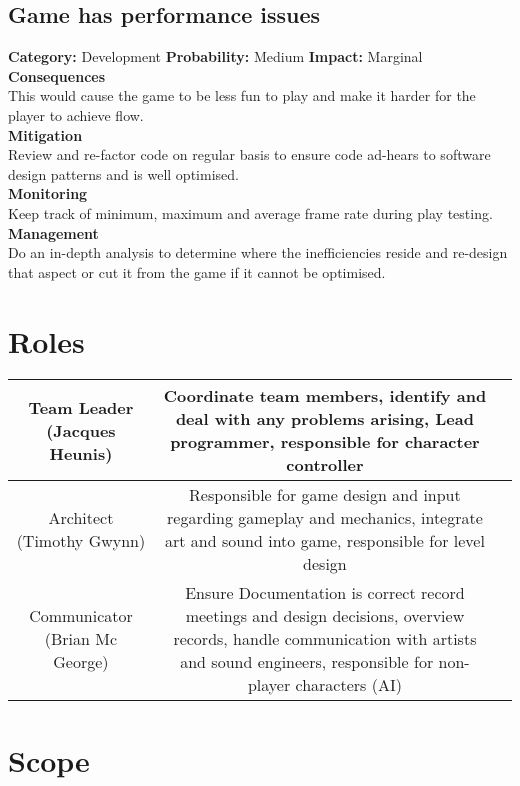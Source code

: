 \documentclass[a4paper,10pt]{article}
\begin{document}
\subsection{Game has performance issues}
\textbf{Category:} Development\newline
\textbf{Probability:} Medium\newline
\textbf{Impact:} Marginal
\\\textbf{Consequences}\\
This would cause the game to be less fun to play and make it harder for the player to achieve flow.
\smallskip\\\textbf{Mitigation}\\
Review and re-factor code on regular basis to ensure code ad-hears to software design patterns and is well optimised.
\smallskip\\\textbf{Monitoring}\\
Keep track of minimum, maximum and average frame rate during play testing.
\smallskip\\\textbf{Management}\\
Do an in-depth analysis to determine where the inefficiencies reside and re-design that aspect or cut it from the game if it cannot be optimised.

\section{Roles}
\begin{center}
	\begin{tabular}{|c|c|p{10cm}}
			\hline
		Team Leader (Jacques Heunis) &\parbox{9cm}{ Coordinate team members, identify and deal with any problems arising, Lead programmer, responsible for character controller}\\
		\hline
		Architect (Timothy Gwynn) &\parbox{9cm}{ Responsible for game design and input regarding gameplay and mechanics, integrate art and sound into game, responsible for level design}\\
		\hline
		Communicator (Brian Mc George) & \parbox{9cm}{Ensure Documentation is correct  record meetings and design decisions, overview records, handle communication with artists and sound engineers, responsible for non-player characters (AI)}\\
		\hline
	\end{tabular}
\end{center}
\section{Scope}
\end{document}
